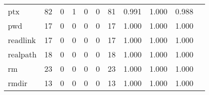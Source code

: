 \begin{longtable}{lp{1.20cm}p{1.20cm}p{1.20cm}p{1.20cm}p{1.20cm}p{1.20cm}p{1.20cm}p{1.20cm}p{1.20cm}p{1.20cm}}
ptx       &                                    82 &                                                  0 &                                                  1 &                                                  0 &                                                  0 &                                                 81 &                                         0.991 &                                              1.000 &                                              0.988 \\
pwd       &                                    17 &                                                  0 &                                                  0 &                                                  0 &                                                  0 &                                                 17 &                                         1.000 &                                              1.000 &                                              1.000 \\
readlink  &                                    17 &                                                  0 &                                                  0 &                                                  0 &                                                  0 &                                                 17 &                                         1.000 &                                              1.000 &                                              1.000 \\
realpath  &                                    18 &                                                  0 &                                                  0 &                                                  0 &                                                  0 &                                                 18 &                                         1.000 &                                              1.000 &                                              1.000 \\
rm        &                                    23 &                                                  0 &                                                  0 &                                                  0 &                                                  0 &                                                 23 &                                         1.000 &                                              1.000 &                                              1.000 \\
rmdir     &                                    13 &                                                  0 &                                                  0 &                                                  0 &                                                  0 &                                                 13 &                                         1.000 &                                              1.000 &                                              1.000 \\

\end{longtable}
